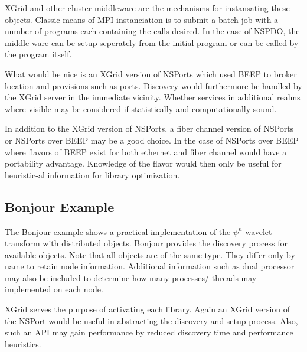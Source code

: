 \documentclass[11pt]{article}
\begin{document}
XGrid and other cluster middleware are the mechanisms for instansating these objects.  Classic means of MPI instanciation is to submit a batch job with a number of programs each containing the calls desired.  In the case of NSPDO, the middle-ware can be setup seperately from the initial program or can be called by the program itself.   %

What would be nice is an XGrid version of NSPorts which used BEEP to broker location and provisions such as ports.   Discovery would furthermore be handled by the XGrid server in the immediate vicinity.  Whether services in additional realms where visible may be considered if statistically and computationally sound.  

In addition to the XGrid version of NSPorts, a fiber channel version of NSPorts or NSPorts over BEEP may be a good choice.  In the case of NSPorts over BEEP where flavors of BEEP exist for both ethernet and fiber channel would have a portability advantage.  Knowledge of the flavor would then only be useful for heuristic-al information for library optimization.  

\subsection {Bonjour Example}
The Bonjour example shows a practical implementation of the $\psi^n$ wavelet transform with distributed objects.  Bonjour provides the discovery process for available objects.  Note that all objects are of the same type.  They differ only by name to retain node information.  Additional information such as dual processor may also be included to determine how many processes/ threads may implemented on each node.  

XGrid serves the purpose of activating each library.  Again an XGrid version of the NSPort would be useful in abstracting the discovery and setup process.  Also, such an API may gain performance by reduced discovery time and performance heuristics.  
\end{document}
